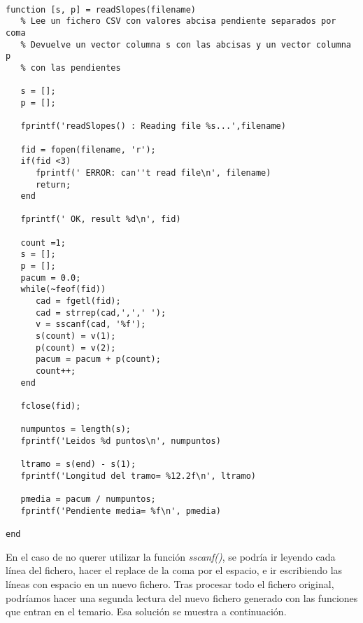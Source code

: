 \documentclass[a4paper,10pt, oneside]{article}
\begin{document}
\begin{lstlisting}[frame=single]

function [s, p] = readSlopes(filename) 
   % Lee un fichero CSV con valores abcisa pendiente separados por coma
   % Devuelve un vector columna s con las abcisas y un vector columna p
   % con las pendientes

   s = [];
   p = [];

   fprintf('readSlopes() : Reading file %s...',filename)

   fid = fopen(filename, 'r');
   if(fid <3) 
      fprintf(' ERROR: can''t read file\n', filename)
      return;
   end

   fprintf(' OK, result %d\n', fid)

   count =1;
   s = [];
   p = [];
   pacum = 0.0;
   while(~feof(fid))
      cad = fgetl(fid);
      cad = strrep(cad,',',' ');
      v = sscanf(cad, '%f');
      s(count) = v(1);
      p(count) = v(2);
      pacum = pacum + p(count);
      count++;
   end

   fclose(fid);

   numpuntos = length(s);
   fprintf('Leidos %d puntos\n', numpuntos)

   ltramo = s(end) - s(1);
   fprintf('Longitud del tramo= %12.2f\n', ltramo)
   
   pmedia = pacum / numpuntos;
   fprintf('Pendiente media= %f\n', pmedia)

end
\end{lstlisting}

En el caso de no querer utilizar la función \textit{sscanf()}, se podría ir leyendo cada línea del fichero, hacer el replace de la coma por el espacio, e ir escribiendo las líneas con espacio en un nuevo fichero. Tras procesar todo el fichero original, podríamos hacer una segunda lectura del nuevo fichero generado con las funciones que entran en el temario. Esa solución se muestra a continuación.
\end{document}
